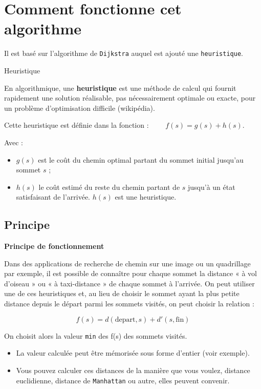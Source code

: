 \section{Comment fonctionne cet algorithme}

Il est basé sur l'algorithme de \texttt{Dijkstra} auquel est ajouté une \texttt{heuristique}.


\begin{defi} {Heuristique}

En algorithmique, une \textbf{heuristique} est une méthode de calcul qui fournit rapidement une solution réalisable, pas nécessairement optimale ou exacte, pour un problème d'optimisation difficile (wikipédia).

Cette heuristique est définie dans la fonction : $\quad \quad f(s)=g(s)+h(s) $.

Avec :
\begin{itemize}
\item $g(s)$ est le coût du chemin optimal partant du sommet initial jusqu'au sommet $s$ ;
\item $h(s)$ le coût estimé du reste du chemin partant de $s$ jusqu'à un état satisfaisant de l'arrivée. $h(s)$ est une heuristique.
\end{itemize}

\end{defi}

\subsection{Principe}


\begin{prop}\textbf{Principe de fonctionnement}

Dans des applications de recherche de chemin sur une image ou un quadrillage par exemple, il est possible de connaître pour chaque sommet la distance « à vol d'oiseau » ou « à taxi-distance » de chaque sommet à l'arrivée. On peut utiliser une de ces heuristiques et, au lieu de choisir le sommet ayant la plus petite distance depuis le départ parmi les sommets visités, on peut choisir la relation :


$$f(s)=d(\text{depart},s)+d'(s,\text{fin}) $$

On choisit alors la valeur \texttt{min} des f(s) des sommets visités.

\end{prop}

\begin{rem}
\begin{itemize}
\item La valeur calculée peut être mémorisée sous forme d'entier (voir exemple).
\item Vous pouvez calculer ces distances de la manière que vous voulez, distance euclidienne, distance de \texttt{Manhattan} ou autre, elles peuvent convenir.\\
\end{itemize}
\end{rem}


